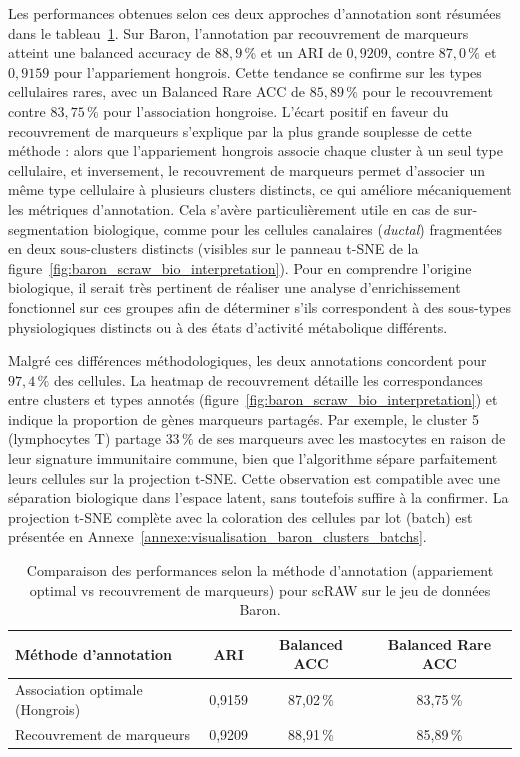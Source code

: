 Les performances obtenues selon ces deux approches d'annotation sont résumées dans le tableau~\ref{tab:baron_annotation_comparison}. Sur Baron, l'annotation par recouvrement de marqueurs atteint une balanced accuracy de $88{,}9\,\%$ et un ARI de $0{,}9209$, contre $87{,}0\,\%$ et $0{,}9159$ pour l'appariement hongrois. Cette tendance se confirme sur les types cellulaires rares, avec un Balanced Rare ACC de $85{,}89\,\%$ pour le recouvrement contre $83{,}75\,\%$ pour l'association hongroise. L'écart positif en faveur du recouvrement de marqueurs s'explique par la plus grande souplesse de cette méthode : alors que l'appariement hongrois associe chaque cluster à un seul type cellulaire, et inversement, le recouvrement de marqueurs permet d'associer un même type cellulaire à plusieurs clusters distincts, ce qui améliore mécaniquement les métriques d'annotation. Cela s'avère particulièrement utile en cas de sur-segmentation biologique, comme pour les cellules canalaires (\textit{ductal}) fragmentées en deux sous-clusters distincts (visibles sur le panneau t-SNE de la figure~\ref{fig:baron_scraw_bio_interpretation}). Pour en comprendre l'origine biologique, il serait très pertinent de réaliser une analyse d'enrichissement fonctionnel sur ces groupes afin de déterminer s'ils correspondent à des sous-types physiologiques distincts ou à des états d'activité métabolique différents.

Malgré ces différences méthodologiques, les deux annotations concordent pour $97{,}4\,\%$ des cellules. La heatmap de recouvrement détaille les correspondances entre clusters et types annotés (figure~\ref{fig:baron_scraw_bio_interpretation}) et indique la proportion de gènes marqueurs partagés. Par exemple, le cluster 5 (lymphocytes T) partage $33\,\%$ de ses marqueurs avec les mastocytes en raison de leur signature immunitaire commune, bien que l'algorithme sépare parfaitement leurs cellules sur la projection t-SNE. Cette observation est compatible avec une séparation biologique dans l'espace latent, sans toutefois suffire à la confirmer. La projection t-SNE complète avec la coloration des cellules par lot (batch) est présentée en Annexe~\ref{annexe:visualisation_baron_clusters_batchs}.

\begin{table}[htbp]
\centering
\renewcommand{\arraystretch}{1.2}
\begin{tabular}{lccc}
\toprule
\textbf{Méthode d'annotation} & \textbf{ARI} & \textbf{Balanced ACC} & \textbf{Balanced Rare ACC} \\
\midrule
Association optimale (Hongrois) & 0{,}9159 & 87{,}02\,\% & 83{,}75\,\% \\
Recouvrement de marqueurs & 0{,}9209 & 88{,}91\,\% & 85{,}89\,\% \\
\bottomrule
\end{tabular}
\caption[Comparaison des méthodes d'annotation pour scRAW sur le jeu de données Baron.]{Comparaison des performances selon la méthode d'annotation (appariement optimal vs recouvrement de marqueurs) pour scRAW sur le jeu de données Baron.}
\label{tab:baron_annotation_comparison}
\end{table}

